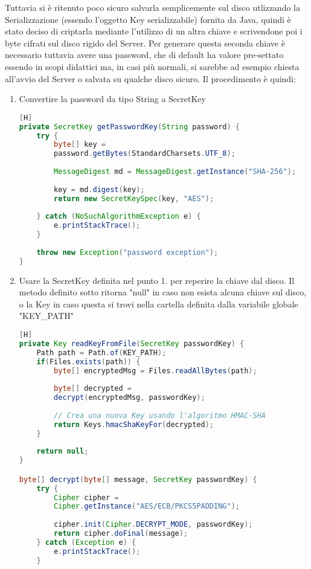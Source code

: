 \noindent
Tuttavia si è ritenuto poco sicuro salvarla semplicemente sul disco utlizzando la Serializzazione\cite{serializable} (essendo l'oggetto Key serializzabile) fornita da Java, quindi è stato deciso di criptarla mediante l'utilizzo di un altra chiave e scrivendone poi i byte cifrati sul disco rigido del Server. Per generare questa seconda chiave è necessario tuttavia avere una password, che di default ha valore pre-settato essendo in scopi didattici ma, in casi più normali, si sarebbe ad esempio chiesta all'avvio del Server o salvata su qualche disco sicuro.
Il procedimento è quindi:
\begin{enumerate}
	\item Convertire la password da tipo String a SecretKey
	\begin{lstlisting}[language=Java, firstnumber=1][H]
private SecretKey getPasswordKey(String password) {
	try {
		byte[] key = 
		password.getBytes(StandardCharsets.UTF_8);
				
		MessageDigest md = MessageDigest.getInstance("SHA-256");
				
		key = md.digest(key);
		return new SecretKeySpec(key, "AES");
				
	} catch (NoSuchAlgorithmException e) {
		e.printStackTrace();
	}
			
	throw new Exception("password exception");
}
	\end{lstlisting}
	
	\item Usare la SecretKey definita nel punto 1. per reperire la chiave dal disco. Il metodo definito sotto ritorna "null" in caso non esista alcuna chiave sul disco, o la Key in caso questa si trovi nella cartella definita dalla variabile globale "KEY\_PATH"
	\begin{lstlisting}[language=Java][H]
private Key readKeyFromFile(SecretKey passwordKey) {
	Path path = Path.of(KEY_PATH);
	if(Files.exists(path)) {
		byte[] encryptedMsg = Files.readAllBytes(path);
		
		byte[] decrypted = 
		decrypt(encryptedMsg, passwordKey);
		
		// Crea una nuova Key usando l'algoritmo HMAC-SHA
		return Keys.hmacShaKeyFor(decrypted);
	}
	
	return null;
}

byte[] decrypt(byte[] message, SecretKey passwordKey) {
	try {
		Cipher cipher = 
		Cipher.getInstance("AES/ECB/PKCS5PADDING");
		
		cipher.init(Cipher.DECRYPT_MODE, passwordKey);
		return cipher.doFinal(message);
	} catch (Exception e) {
		e.printStackTrace();
	}
	

\end{lstlisting}
\end{enumerate}
